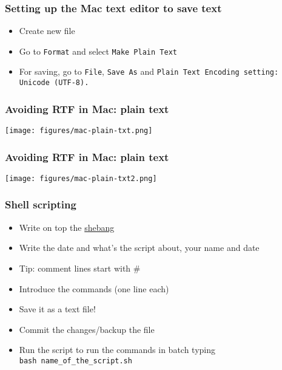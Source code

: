 \documentclass{beamer}
\begin{document}
\begin{frame}
  \frametitle{Setting up the Mac text editor to save text}

  \begin{itemize}
  \item Create new file
  \item Go to \texttt{Format} and select \texttt{Make Plain Text}
  \item For saving, go to \texttt{File}, \texttt{Save As} and \texttt{Plain Text Encoding setting: Unicode (UTF-8).}
 
  \end{itemize}

\end{frame}



\begin{frame}
  \frametitle{Avoiding RTF in Mac: plain text}
\centering
\texttt{[image: figures/mac-plain-txt.png]}
\end{frame}


\begin{frame}
  \frametitle{Avoiding RTF in Mac: plain text}
\centering
\texttt{[image: figures/mac-plain-txt2.png]}
\end{frame}






\begin{frame}
  \frametitle{Shell scripting}
  \begin{itemize}
  \item Write on top the \href{https://en.wikipedia.org/wiki/Shebang_(Unix)}{shebang}
  \item Write the date and what's the script about, your name and date
  \item Tip: comment lines start with \#
  \item Introduce the commands (one line each)
  \item Save it as a text file!
  \item Commit the changes/backup the file
  \item Run the script to run the commands in batch typing \texttt{bash\ name\_of\_the\_script.sh}
  \end{itemize}

  
\end{frame}
\end{document}
